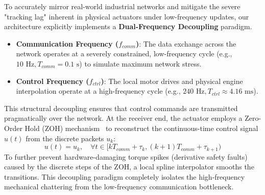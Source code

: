 To accurately mirror real-world industrial networks and mitigate the severe "tracking lag" inherent in physical actuators under low-frequency updates, our architecture explicitly implements a \textbf{Dual-Frequency Decoupling} paradigm. 
\begin{itemize}
    \item \textbf{Communication Frequency ($f_{comm}$)}: The data exchange across the network operates at a severely constrained, low-frequency cycle (e.g., $10 \text{ Hz}, T_{comm} = 0.1 \text{ s}$) to simulate maximum network stress.
    \item \textbf{Control Frequency ($f_{ctrl}$)}: The local motor drives and physical engine interpolation operate at a high-frequency cycle (e.g., $240 \text{ Hz}, T_{ctrl} \approx 4.16 \text{ ms}$).
\end{itemize}
This structural decoupling ensures that control commands are transmitted pragmatically over the network. At the receiver end, the actuator employs a Zero-Order Hold (ZOH) mechanism~\cite{CCSTD,SNCS} to reconstruct the continuous-time control signal $u(t)$ from the discrete packets $u_k$:
\begin{equation}
    u(t) = u_k, \quad \forall t \in [k T_{comm} + \tau_k, (k+1) T_{comm} + \tau_{k+1})
\end{equation}
To further prevent hardware-damaging torque spikes (derivative safety faults) caused by the discrete steps of the ZOH, a local spline interpolator smooths the transitions. This decoupling paradigm completely isolates the high-frequency mechanical chattering from the low-frequency communication bottleneck.

